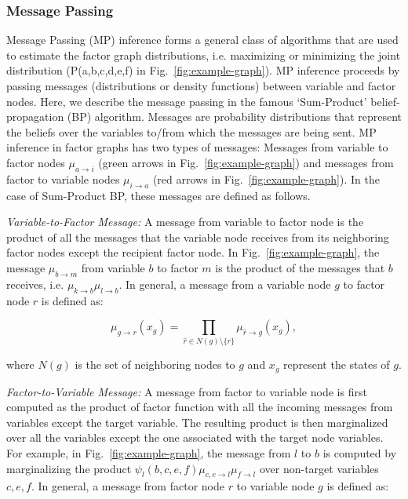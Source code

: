 \subsubsection{Message Passing} Message Passing (MP) inference forms a general class
of algorithms that are used to estimate the factor graph distributions,
i.e. maximizing or minimizing the joint distribution (P(a,b,c,d,e,f) in Fig.~\ref{fig:example-graph}).
MP inference proceeds by passing messages (distributions or density functions)
between variable and factor nodes. Here, we describe the message passing in the
famous `Sum-Product' belief-propagation (BP) algorithm.
Messages are probability distributions that represent the beliefs
over the variables to/from which the messages are being sent.
MP inference in factor graphs has two types of messages: Messages
from variable to factor nodes $\mu_{a\rightarrow i}$ (green arrows in Fig.~\ref{fig:example-graph})
and messages from factor to variable nodes $\mu_{i\rightarrow a}$
(red arrows in Fig.~\ref{fig:example-graph}).
In the case of Sum-Product BP, these messages are defined as follows.

\textit{Variable-to-Factor Message:} A message from variable to factor node
is the product of all the messages that the variable node receives from its
neighboring factor nodes except the recipient factor node.
In Fig.~\ref{fig:example-graph}, the message $\mu_{b \rightarrow m}$
from variable $b$ to factor $m$ is the product of the messages that $b$ receives,
i.e. $\mu_{k \rightarrow b} \mu_{l \rightarrow b}$. In general, a message from
a variable node $g$ to factor node $r$ is defined as:

\begin{equation}
\mu_{g \rightarrow r}(x_g) = \prod_{\hat{r}\in N(g)\setminus \{r\}} \mu_{\hat{r} \rightarrow g}(x_g),
\end{equation}

where $N(g)$ is the set of neighboring nodes to $g$ and $x_g$ represent the states
of $g$.

\textit{Factor-to-Variable Message:} A message from factor to variable node
is first computed as the product of factor function with all the incoming messages
from variables except the target variable. The resulting product is then marginalized
over all the variables except the one associated with the target node variables.
For example, in Fig.~\ref{fig:example-graph}, the message from $l$ to $b$ is computed
by marginalizing the product $\psi_l(b,c,e,f)\mu_{c,e\rightarrow l}\mu_{f\rightarrow l}$
over non-target variables $c,e,f$. In general, a message from factor node $r$
to variable node $g$ is defined as:

